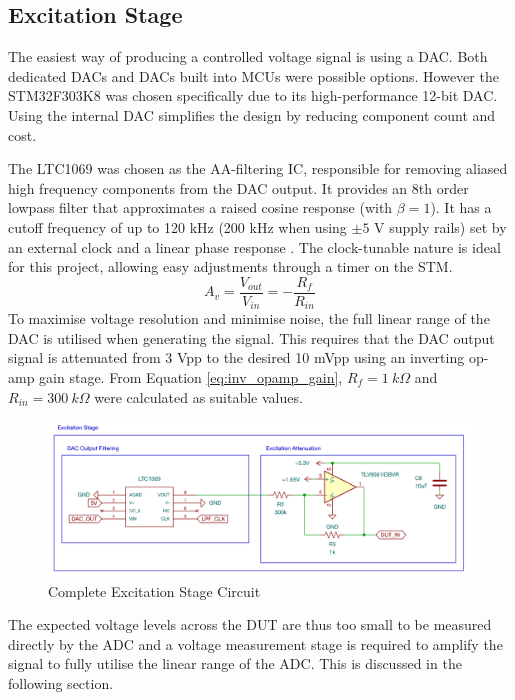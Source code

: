 \subsection{Excitation Stage}\label{subsec:design_excitation}
The easiest way of producing a controlled voltage signal is using a \ac{DAC}. Both dedicated \acp{DAC} and \acp{DAC} built into \acp{MCU} were possible options. However the STM32F303K8 was chosen specifically due to its high-performance 12-bit \ac{DAC}. Using the internal \ac{DAC} simplifies the design by reducing component count and cost.

The LTC1069 was chosen as the AA-filtering \ac{IC}, responsible for removing aliased high frequency components from the \ac{DAC} output. It provides an 8th order lowpass filter that approximates a raised cosine response (with $\beta=1$). It has a cutoff frequency of up to 120 kHz (200 kHz when using $\pm5$ V supply rails) set by an external clock and a linear phase response \cite{LTC10697CS8PBF}. The clock-tunable nature is ideal for this project, allowing easy adjustments through a timer on the STM.
\begin{equation}
    A_v = \frac{V_{out}}{V_{in}} = -\frac{R_f}{R_{in}}
    \label{eq:inv_opamp_gain}
\end{equation}
To maximise voltage resolution and minimise noise, the full linear range of the \ac{DAC} is utilised when generating the signal. This requires that the \ac{DAC} output signal is attenuated from 3 Vpp to the desired 10 mVpp using an inverting op-amp gain stage. From Equation \ref{eq:inv_opamp_gain}, $R_{f}=1~k\Omega$ and $R_{in}=300~k\Omega$ were calculated as suitable values.
\begin{figure}[H]
    \centering
    \includegraphics[width=\textwidth]{ExcitationSchem.png}
    \caption{Complete Excitation Stage Circuit}
    \label{fig:excitation_stage_circuit}
\end{figure}
The expected voltage levels across the \ac{DUT} are thus too small to be measured directly by the \ac{ADC} and a voltage measurement stage is required to amplify the signal to fully utilise the linear range of the \ac{ADC}. This is discussed in the following section.

